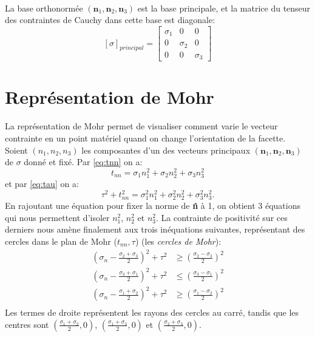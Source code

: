 \paragraph{}
La base orthonormée $(\textbf{\^n}_1,\textbf{\^n}_2,\textbf{\^n}_3)$ est la base principale, et la matrice du tenseur des contraintes de Cauchy dans cette base est diagonale:
$$[\sigma]_{principal}=\left[
\begin{array}{ccc}
\sigma_1&0&0\\
0&\sigma_2&0\\
0&0&\sigma_3
\end{array}\right]$$

\section{Représentation de Mohr}
La représentation de Mohr permet de visualiser comment varie le vecteur contrainte en un point matériel quand on change l'orientation de la facette. Soient $(n_1, n_2, n_3)$ les composantes d'un des vecteurs principaux $(\textbf{\^n}_1,\textbf{\^n}_2,\textbf{\^n}_3)$ de $\sigma$ donné et fixé. Par \ref{eq:tnn} on a:
$$t_{nn}=\sigma_1n_1^2+\sigma_2n_2^2+\sigma_3n_3^2$$ et par \ref{eq:tau} on a:
$$\tau^2+t_{nn}^2=\sigma_1^2 n_1^2+\sigma_2^2 n_2^2+\sigma_3^2 n_3^2.$$ En rajoutant une équation pour fixer la norme de \textbf{\^n} à 1, on obtient 3 équations qui nous permettent d'isoler $n_1^2$, $n_2^2$ et $n_3^2$. La contrainte de positivité sur ces derniers nous amène finalement aux trois inéquations suivantes, représentant des cercles dans le plan de Mohr ($t_{nn},\tau$) (les \emph{cercles de Mohr}):
$$\begin{aligned}
\left(\sigma_n-\frac{\sigma_2+\sigma_3}{2}\right)^2+\tau^2&\geq \left(\frac{\sigma_2-\sigma_3}{2}\right)^2\\
\left(\sigma_n-\frac{\sigma_3+\sigma_1}{2}\right)^2+\tau^2&\leq \left(\frac{\sigma_3-\sigma_1}{2}\right)^2\\
\left(\sigma_n-\frac{\sigma_1+\sigma_2}{2}\right)^2+\tau^2&\geq \left(\frac{\sigma_1-\sigma_2}{2}\right)^2\\
\end{aligned}$$
Les termes de droite représentent les rayons des cercles au carré, tandis que les centres sont $\left(\frac{\sigma_1+\sigma_2}{2},0\right)$, $\left(\frac{\sigma_1+\sigma_3}{2},0\right)$ et $\left(\frac{\sigma_2+\sigma_3}{2},0\right)$.
